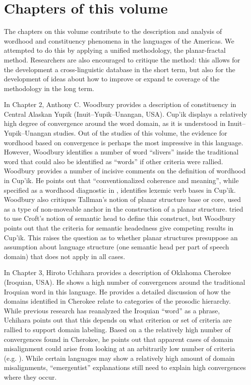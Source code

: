 \documentclass[output=paper,hidelinks]{langscibook}
\begin{document}
\section{Chapters of this volume}
\label{sec:chapters}

The chapters on this volume contribute to the description and analysis of wordhood and constituency phenomena in the languages of the Americas. We attempted to do this by applying a unified methodology, the planar-fractal method. Researchers are also encouraged to critique the method: this allows for the development a cross-linguistic database in the short term, but also for the development of ideas about how to improve or expand te coverage of the methodology in the long term.

In Chapter 2, Anthony C. Woodbury provides a description of constituency in Central Alaskan Yupik (Inuit–Yupik–Unangan, USA). Cup'ik displays a relatively high degree of convergence around the word domain, as it is understood in Inuit–Yupik–Unangan studies. Out of the studies of this volume, the evidence for wordhood based on convergence is perhaps the most impressive in this language. However, Woodbury identifies a number of word ``slivers'' inside the traditional word that could also be identified as ``words'' if other criteria were rallied. Woodbury provides a number of incisive comments on the definition of wordhood in Cup'ik. He points out that ``conventionalized coherence and meaning'', while specified as a wordhood diagnostic in \cite{dixonaikhenvald02}, identifies lexemic verb bases in Cup'ik. Woodbury also critiques Tallman's \citeyear{tallman2021constituency} notion of planar structure base or core, used as a type of non-moveable anchor in the construction of a planar structure. \citet{tallman2021constituency} tried to use Croft's notion of semantic head to define this construct, but Woodbury points out that the criteria for semantic headedness give competing results in Cup'ik. This raises the question as to whether planar structures presuppose an assumption about language structure (one semantic head per part of speech domain) that does not apply in all cases.

In Chapter 3, Hiroto Uchihara provides a description of Oklahoma Cherokee (Iroquian, USA). He shows a high number of convergences around the traditional Iroquian word in this language. He provides a detailed discussion of how the domains identified in Cherokee relate to categories of the prosodic hierarchy. While previous research has reanalyzed the Iroquian ``word'' as a phrase, Uchihara points out that this depends on what criterion or set of criteria are rallied to support domain labeling. Based on a the relatively high number of convergences found in Cherokee, he points out that apparent cases of domain misalignment could arise from looking at an arbitrarily low number of criteria (e.g. \citealt{Bickel2017}). While certain languages may show a relatively high amount of domain misalignments, ``emergentist'' explanations still need to explain high convergences where they occur.
\end{document}
